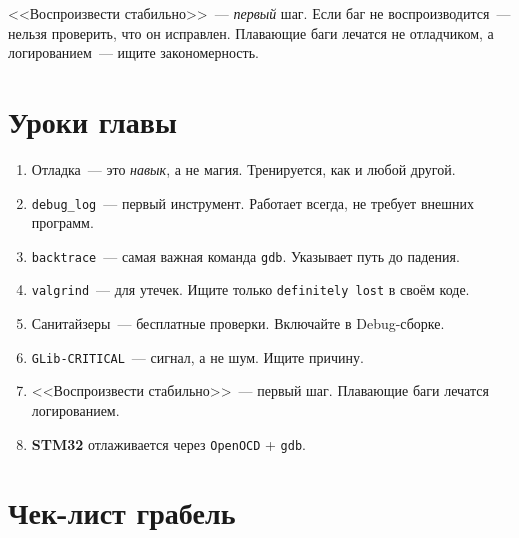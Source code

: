 \begin{ideabox}
<<Воспроизвести стабильно>>~--- \emph{первый} шаг.
Если баг не воспроизводится~--- нельзя
проверить, что он исправлен. Плавающие
баги лечатся не отладчиком, а
логированием~--- ищите закономерность.
\end{ideabox}

\section{Уроки главы}
\label{sec:debug-lessons}

\begin{enumerate}
    \item Отладка~--- это \emph{навык}, а не магия.
          Тренируется, как и любой другой.
    \item \texttt{debug\_log}~--- первый инструмент.
          Работает всегда, не требует внешних программ.
    \item \texttt{backtrace}~--- самая важная команда
          \texttt{gdb}. Указывает путь до падения.
    \item \texttt{valgrind}~--- для утечек. Ищите
          только \texttt{definitely lost} в своём коде.
    \item Санитайзеры~--- бесплатные проверки.
          Включайте в Debug-сборке.
    \item \texttt{GLib-CRITICAL}~--- сигнал, а не шум.
          Ищите причину.
    \item <<Воспроизвести стабильно>>~--- первый шаг.
          Плавающие баги лечатся логированием.
    \item \textbf{STM32} отлаживается через
          \texttt{OpenOCD} + \texttt{gdb}.
\end{enumerate}

\section{Чек-лист грабель}
\label{sec:debug-pitfalls}


